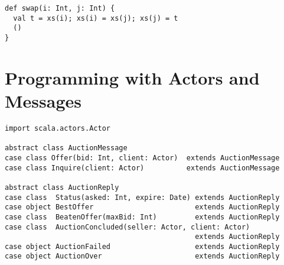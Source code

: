 \begin{lstlisting}
def swap(i: Int, j: Int) {
  val t = xs(i); xs(i) = xs(j); xs(j) = t
  ()
}
\end{lstlisting}


\chapter{Programming with Actors and Messages}
\label{chap:example-auction}
\begin{lstlisting}[style=floating,label=fig:simple-auction-msgs,caption=Message
    Classes for an Auction Service]
import scala.actors.Actor

abstract class AuctionMessage
case class Offer(bid: Int, client: Actor)  extends AuctionMessage
case class Inquire(client: Actor)          extends AuctionMessage

abstract class AuctionReply
case class  Status(asked: Int, expire: Date) extends AuctionReply
case object BestOffer                        extends AuctionReply
case class  BeatenOffer(maxBid: Int)         extends AuctionReply
case class  AuctionConcluded(seller: Actor, client: Actor) 
                                             extends AuctionReply
case object AuctionFailed                    extends AuctionReply
case object AuctionOver                      extends AuctionReply
\end{lstlisting}

